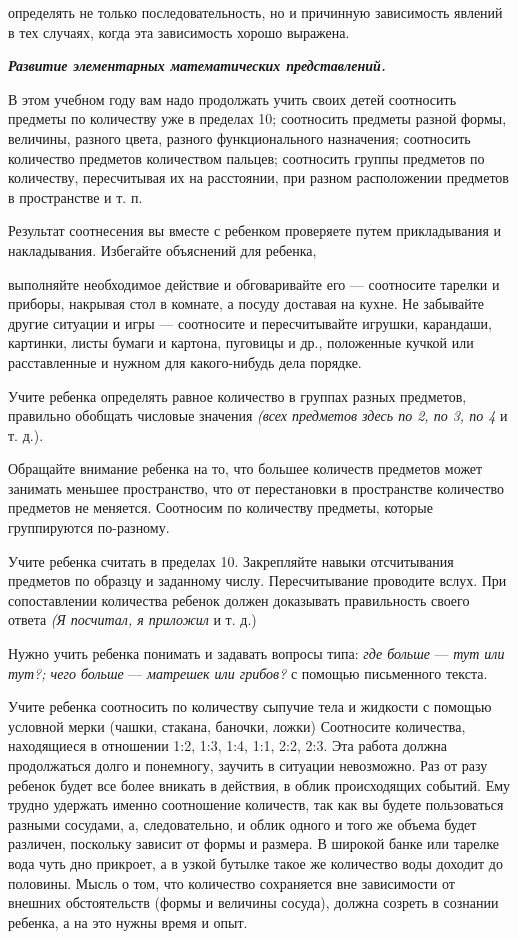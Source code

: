 \documentclass[a5paper]{book}
\renewcommand{\emph}[1]{\textit{#1}}
\begin{document}
определять не только последовательность, но и причинную зависимость
явлений в тех случаях, когда эта зависимость хорошо выражена.

\emph{\textbf{Развитие элементарных математических представлений.}}

В этом учебном году вам надо продолжать учить своих детей соотносить
предметы по количеству уже в пределах 10; соотносить предметы разной
формы, величины, разного цвета, разного функционального назначения;
соотносить количество предметов количеством пальцев; соотносить группы
предметов по количеству, пересчитывая их на расстоянии, при разном
расположении предметов в пространстве и т. п.

Результат соотнесения вы вместе с ребенком проверяете путем
прикладывания и накладывания. Избегайте объяснений для ребенка,

выполняйте необходимое действие и обговаривайте его --- соотносите
тарелки и приборы, накрывая стол в комнате, а посуду доставая на кухне.
Не забывайте другие ситуации и игры --- соотносите и пересчитывайте
игрушки, карандаши, картинки, листы бумаги и картона, пуговицы и др.,
положенные кучкой или расставленные и нужном для какого-нибудь дела
порядке.

Учите ребенка определять равное количество в группах разных предметов,
правильно обобщать числовые значения \emph{(всех предметов здесь по 2,
по 3, по 4} и т. д.).

Обращайте внимание ребенка на то, что большее количеств предметов может
занимать меньшее пространство, что от перестановки в пространстве
количество предметов не меняется. Соотносим по количеству предметы,
которые группируются по-разному.

Учите ребенка считать в пределах 10. Закрепляйте навыки отсчитывания
предметов по образцу и заданному числу. Пересчитывание проводите вслух.
При сопоставлении количества ребенок должен доказывать правильность
своего ответа \emph{(Я посчитал, я приложил} и т. д.)

Нужно учить ребенка понимать и задавать вопросы типа: \emph{где больше}
--- \emph{тут или тут?; чего больше} --- \emph{матрешек или грибов?} с
помощью письменного текста.

Учите ребенка соотносить по количеству сыпучие тела и жидкости с помощью
условной мерки (чашки, стакана, баночки, ложки) Соотносите количества,
находящиеся в отношении 1:2, 1:3, 1:4, 1:1, 2:2, 2:3. Эта работа должна
продолжаться долго и понемногу, заучить в ситуации невозможно. Раз от
разу ребенок будет все более вникать в действия, в облик происходящих
событий. Ему трудно удержать именно соотношение количеств, так как вы
будете пользоваться разными сосудами, а, следовательно, и облик одного и
того же объема будет различен, поскольку зависит от формы и размера. В
широкой банке или тарелке вода чуть дно прикроет, а в узкой бутылке
такое же количество воды доходит до половины. Мысль о том, что
количество сохраняется вне зависимости от внешних обстоятельств (формы и
величины сосуда), должна созреть в сознании ребенка, а на это нужны
время и опыт.
\end{document}
